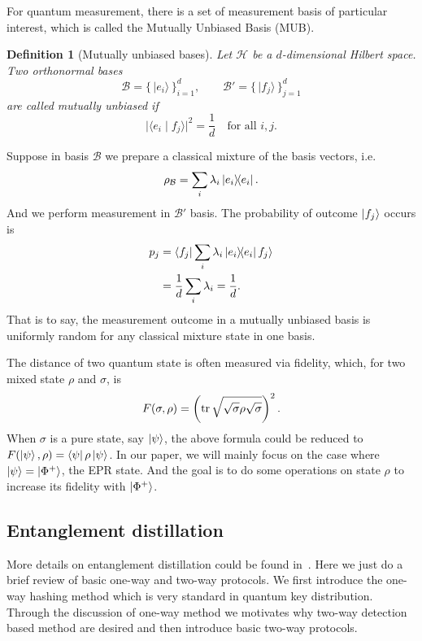 \documentclass[onecolumn,prx,longbibliography,nofootinbib, superscriptaddress]{revtex4-2}
\newtheorem{definition}{Definition}
\theoremstyle{recap}
\begin{document}
For quantum measurement, there is a set of measurement basis of particular interest, which is called the Mutually Unbiased Basis (MUB). 
\begin{definition}[Mutually unbiased bases]
Let $\mathcal{H}$ be a $d$-dimensional Hilbert space. Two orthonormal bases
\[
\mathcal{B} = \{\,\lvert e_i \rangle \,\}_{i=1}^d,
\qquad
\mathcal{B}' = \{\,\lvert f_j \rangle \,\}_{j=1}^d
\]
are called \emph{mutually unbiased} if
\[
\bigl\lvert \langle e_i \mid f_j \rangle \bigr\rvert^2 = \frac{1}{d}
\quad
\text{for all } i,j .
\]
\end{definition}

Suppose in basis $\mathcal{B}$ we prepare a classical mixture of the basis vectors, i.e. 
\begin{equation}
    \rho_{\mathcal{B}}=\sum_{i}\lambda_i\ketbra{e_i}{e_i}.
\end{equation}
And we perform measurement in $\mathcal{B}'$ basis. The probability of outcome $\ket{f_j}$ occurs is
\begin{equation}
\begin{split}
    p_j&=\bra{f_j}\sum_{i}\lambda_i\ketbra{e_i}{e_i}f_j\rangle\\
    &=\frac{1}{d}\sum_{i}\lambda_i=\frac{1}{d}.
\end{split}
\end{equation}
That is to say, the measurement outcome in a mutually unbiased basis is uniformly random for any classical mixture state in one basis. 

The distance of two quantum state is often measured via fidelity, which, for two mixed state $\rho$ and $\sigma$, is
\begin{equation}
    F(\sigma,\rho)=\left(\tr\sqrt{\sqrt{\sigma}\rho\sqrt{\sigma}}\right)^2.
\end{equation}
When $\sigma$ is a pure state, say $\ket{\psi}$, the above formula could be reduced to $F(\ket{\psi},\rho)=\bra{\psi}\rho\ket{\psi}$. In our paper, we will mainly focus on the case where $\ket{\psi}=\ket{\Phi^+}$, the EPR state. And the goal is to do some operations on state $\rho$ to increase its fidelity with $\ket{\Phi^+}$.

\subsection{Entanglement distillation}\label{appendix:EDP}
More details on entanglement distillation could be found in~\cite{BDSW}. Here we just do a brief review of basic one-way and two-way protocols. We first introduce the one-way hashing method which is very standard in quantum key distribution. Through the discussion of one-way method we motivates why two-way detection based method are desired and then introduce basic two-way protocols.
\end{document}
